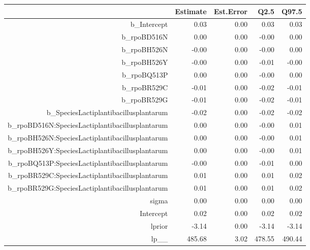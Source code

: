 \begin{table}[ht]
\centering
\begin{tabular}{rrrrr}
  \hline
 & Estimate & Est.Error & Q2.5 & Q97.5 \\ 
  \hline
b\_Intercept & 0.03 & 0.00 & 0.03 & 0.03 \\ 
  b\_rpoBD516N & 0.00 & 0.00 & -0.00 & 0.00 \\ 
  b\_rpoBH526N & -0.00 & 0.00 & -0.00 & 0.00 \\ 
  b\_rpoBH526Y & -0.00 & 0.00 & -0.01 & -0.00 \\ 
  b\_rpoBQ513P & 0.00 & 0.00 & -0.00 & 0.00 \\ 
  b\_rpoBR529C & -0.01 & 0.00 & -0.02 & -0.01 \\ 
  b\_rpoBR529G & -0.01 & 0.00 & -0.02 & -0.01 \\ 
  b\_SpeciesLactiplantibacillusplantarum & -0.02 & 0.00 & -0.02 & -0.02 \\ 
  b\_rpoBD516N:SpeciesLactiplantibacillusplantarum & 0.00 & 0.00 & -0.00 & 0.01 \\ 
  b\_rpoBH526N:SpeciesLactiplantibacillusplantarum & 0.00 & 0.00 & -0.00 & 0.01 \\ 
  b\_rpoBH526Y:SpeciesLactiplantibacillusplantarum & 0.00 & 0.00 & -0.00 & 0.01 \\ 
  b\_rpoBQ513P:SpeciesLactiplantibacillusplantarum & -0.00 & 0.00 & -0.01 & 0.00 \\ 
  b\_rpoBR529C:SpeciesLactiplantibacillusplantarum & 0.01 & 0.00 & 0.01 & 0.02 \\ 
  b\_rpoBR529G:SpeciesLactiplantibacillusplantarum & 0.01 & 0.00 & 0.01 & 0.02 \\ 
  sigma & 0.00 & 0.00 & 0.00 & 0.00 \\ 
  Intercept & 0.02 & 0.00 & 0.02 & 0.02 \\ 
  lprior & -3.14 & 0.00 & -3.14 & -3.14 \\ 
  lp\_\_ & 485.68 & 3.02 & 478.55 & 490.44 \\ 
   \hline
\end{tabular}
\end{table}
